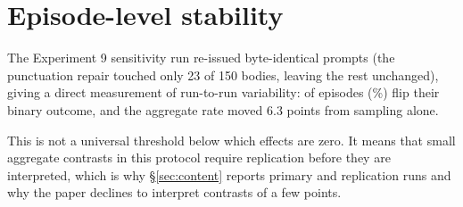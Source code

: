 \section{Episode-level stability}\label{app:stability}

The Experiment 9 sensitivity run re-issued \StabilityN{} byte-identical prompts
(the punctuation repair touched only 23 of 150 bodies, leaving the rest
unchanged), giving a direct measurement of run-to-run variability:
\StabilityFlip{} of \StabilityN{} episodes (\StabilityFlipPct\%) flip their
binary outcome, and the aggregate rate moved 6.3 points from sampling alone.

\begin{center}\small

\end{center}

This is not a universal threshold below which effects are zero. It means that
small aggregate contrasts in this protocol require replication before they are interpreted, which is why \S\ref{sec:content} reports primary and replication runs
and why the paper declines to interpret contrasts of a few points.
